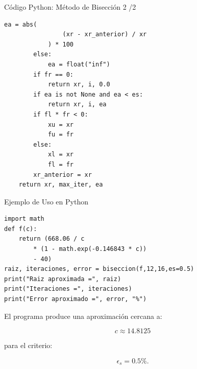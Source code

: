 \documentclass[../../main.tex]{subfiles}
\begin{document}
\begin{frame}[fragile]{Código Python: Método de Bisección 2 /2}

\scriptsize

\begin{lstlisting}[style=mypython]
            ea = abs(
                (xr - xr_anterior) / xr
            ) * 100
        else:
            ea = float("inf")
        if fr == 0:
            return xr, i, 0.0
        if ea is not None and ea < es:
            return xr, i, ea
        if fl * fr < 0:
            xu = xr
            fu = fr
        else:
            xl = xr
            fl = fr
        xr_anterior = xr
    return xr, max_iter, ea
\end{lstlisting}

\end{frame}



\begin{frame}[fragile]{Ejemplo de Uso en Python}

\scriptsize

\begin{lstlisting}[style=mypython]
import math
def f(c):
    return (668.06 / c
        * (1 - math.exp(-0.146843 * c))
        - 40)
raiz, iteraciones, error = biseccion(f,12,16,es=0.5)
print("Raiz aproximada =", raiz)
print("Iteraciones =", iteraciones)
print("Error aproximado =", error, "%")
\end{lstlisting}

El programa produce una aproximación cercana a:

\[
c\approx14.8125
\]

para el criterio:

\[
\epsilon_s=0.5\%.
\]

\end{frame}


\end{document}
